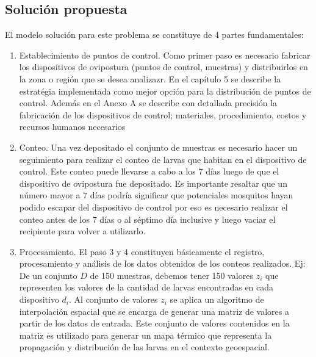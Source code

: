 \subsection{Solución propuesta}
El modelo solución para este problema se constituye de 4 partes fundamentales:

\begin{enumerate}[style=multiline,leftmargin=1.5cm]
    \item Establecimiento de puntos de control. Como primer paso es necesario fabricar los dispositivos de
     ovipostura (puntos de control, muestras) y distribuirlos en la zona o región que se desea analizazr. En el
     capítulo 5 se describe la estratégia implementada como mejor opción para la distribución de puntos de control.
     Además en el Anexo A se describe con detallada precisión la fabricación de los dispositivos de control;
     materiales, procedimiento, costos y recursos humanos necesarios
    
    \item Conteo. Una vez depositado el conjunto de muestras es necesario hacer un seguimiento para realizar el conteo de larvas que habitan en el dispositivo de control. Este conteo puede llevarse a cabo a los 7 días luego de que el dispositivo de ovipostura fue depositado. Es importante resaltar que un número mayor a 7 días podría significar que potenciales mosquitos hayan podido escapar del dispositivo de control por eso es necesario realizar el conteo antes de los 7 días o al séptimo día inclusive y luego vaciar el recipiente para volver a utilizarlo. 
    
    \item Procesamiento. El paso 3 y 4 constituyen básicamente el registro, procesamiento y análisis de los datos obtenidos de los conteos realizados. Ej: De un conjunto $D$ de 150 muestras, debemos tener 150 valores $z_{i}$ que representen los valores de la cantidad de larvas encontradas en cada dispositivo $d_{i}$. Al conjunto de valores $z_{i}$ se aplica un algoritmo de interpolación espacial que se encarga de generar una matriz de valores a partir de los datos de entrada. Este conjunto de valores contenidos en la matriz es utilizado para generar un mapa térmico que representa la propagación y distribución de las larvas en el contexto geoespacial.


\end{enumerate}
